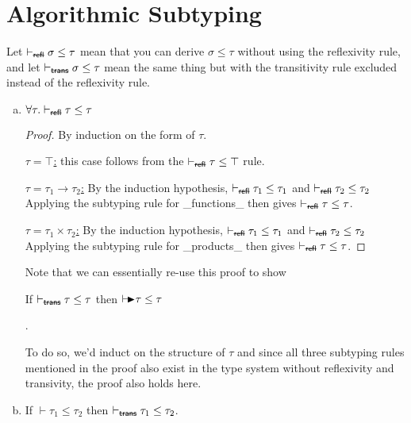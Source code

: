 \section{Algorithmic Subtyping}
\newcommand{\subtype}[2]{\vdash #1 \leq #2}
\newcommand{\subtypeNoRefl}[2]{\vdash_\text{\sout{\sf refl}} #1 \leq #2}
\newcommand{\subtypeNoTrans}[2]{\vdash_\text{\sout{\sf trans}} #1 \leq #2}
\newcommand{\algoSubtype}[2]{\vdash\hspace{-1.5mm}\RHD #1 \leq #2}

Let $\subtypeNoRefl \sigma \tau$ mean that you can derive $\sigma \leq \tau$
without using the reflexivity rule, and let $\subtypeNoTrans \sigma \tau$ mean the same
thing but with the transitivity rule excluded instead of the reflexivity rule.

\begin{enumerate}[(a)]
\item
    \begin{lemma} $\forall \tau . \subtypeNoRefl \tau \tau$ \end{lemma}
    \begin{proof} By induction on the form of $\tau$.

    \underline{$\tau = \top$:} this case follows from the $\subtypeNoRefl \tau \top$
    rule.

    \underline{$\tau = \tau_1 \rightarrow \tau_2$:} By the induction hypothesis,
    $\subtypeNoRefl{\tau_1}{\tau_1}$ and $\subtypeNoRefl{\tau_2}{\tau_2}$
    Applying the subtyping rule for _functions_ then gives
    $\subtypeNoRefl \tau \tau $.

    \underline{$\tau = \tau_1 \times \tau_2$:} By the induction hypothesis,
    $\subtypeNoRefl{\tau_1}{\tau_1}$ and $\subtypeNoRefl{\tau_2}{\tau_2}$
    Applying the subtyping rule for _products_ then gives
    $\subtypeNoRefl \tau \tau$.

    \end{proof}

    Note that we can essentially re-use this proof to show

    \begin{lemma} If $\subtypeNoTrans{\tau}{\tau}$ then $\algoSubtype{\tau}{\tau}$ \end{lemma}.

    To do so, we'd induct on the structure of $\tau$ and since all three subtyping rules mentioned in the proof also
    exist in the type system without reflexivity and transivity, the proof also holds here.

\item
    \begin{lemma} If $\subtype{\tau_1}{\tau_2}$ then $\subtypeNoTrans{\tau_1}{\tau_2}$. \end{lemma}


\end{enumerate}
